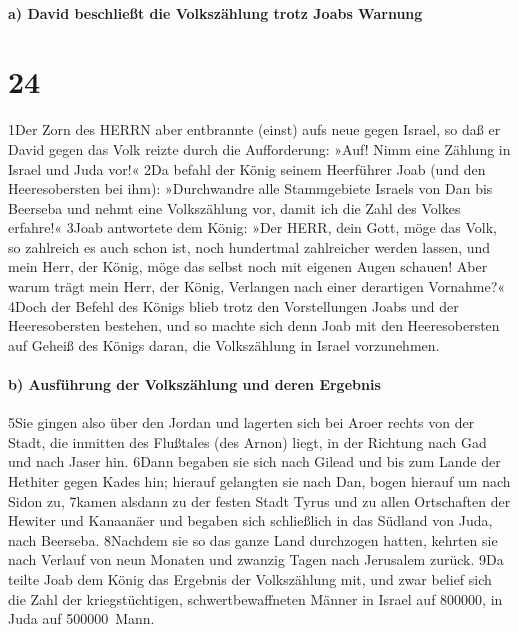 \hypertarget{a-david-beschlieuxdft-die-volkszuxe4hlung-trotz-joabs-warnung}{%
\paragraph{a) David beschließt die Volkszählung trotz Joabs
Warnung}\label{a-david-beschlieuxdft-die-volkszuxe4hlung-trotz-joabs-warnung}}

\hypertarget{section-23}{%
\section{24}\label{section-23}}

1Der Zorn des HERRN aber entbrannte (einst) aufs neue gegen Israel, so
daß er David gegen das Volk reizte durch die Aufforderung: »Auf! Nimm
eine Zählung in Israel und Juda vor!« 2Da befahl der König seinem
Heerführer Joab (und den Heeresobersten bei ihm): »Durchwandre alle
Stammgebiete Israels von Dan bis Beerseba und nehmt eine Volkszählung
vor, damit ich die Zahl des Volkes erfahre!« 3Joab antwortete dem König:
»Der HERR, dein Gott, möge das Volk, so zahlreich es auch schon ist,
noch hundertmal zahlreicher werden lassen, und mein Herr, der König,
möge das selbst noch mit eigenen Augen schauen! Aber warum trägt mein
Herr, der König, Verlangen nach einer derartigen Vornahme?« 4Doch der
Befehl des Königs blieb trotz den Vorstellungen Joabs und der
Heeresobersten bestehen, und so machte sich denn Joab mit den
Heeresobersten auf Geheiß des Königs daran, die Volkszählung in Israel
vorzunehmen.

\hypertarget{b-ausfuxfchrung-der-volkszuxe4hlung-und-deren-ergebnis}{%
\paragraph{b) Ausführung der Volkszählung und deren
Ergebnis}\label{b-ausfuxfchrung-der-volkszuxe4hlung-und-deren-ergebnis}}

5Sie gingen also über den Jordan und lagerten sich bei Aroer rechts von
der Stadt, die inmitten des Flußtales (des Arnon) liegt, in der Richtung
nach Gad und nach Jaser hin. 6Dann begaben sie sich nach Gilead und bis
zum Lande der Hethiter gegen Kades hin; hierauf gelangten sie nach Dan,
bogen hierauf um nach Sidon zu, 7kamen alsdann zu der festen Stadt Tyrus
und zu allen Ortschaften der Hewiter und Kanaanäer und begaben sich
schließlich in das Südland von Juda, nach Beerseba. 8Nachdem sie so das
ganze Land durchzogen hatten, kehrten sie nach Verlauf von neun Monaten
und zwanzig Tagen nach Jerusalem zurück. 9Da teilte Joab dem König das
Ergebnis der Volkszählung mit, und zwar belief sich die Zahl der
kriegstüchtigen, schwertbewaffneten Männer in Israel auf 800000, in Juda
auf 500000~Mann.

